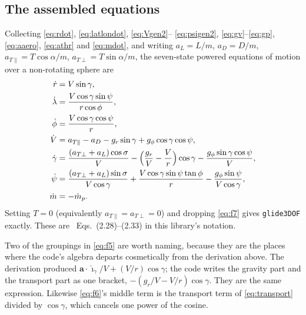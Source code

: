 \documentclass[11pt]{article}
\newcommand{\ig}{\hat{\boldsymbol{\imath}}_{\gamma}}
\newcommand{\code}[1]{\texttt{#1}}
\begin{document}
\subsection{The assembled equations}
\label{sec:assembled}

Collecting \eqref{eq:rdot}, \eqref{eq:latlondot}, \eqref{eq:Vgen2}--%
\eqref{eq:psigen2}, \eqref{eq:gv}--\eqref{eq:gp}, \eqref{eq:aaero},
\eqref{eq:athr} and \eqref{eq:mdot}, and writing $a_L = L/m$, $a_D = D/m$,
$a_{T\parallel} = T\cos\alpha/m$, $a_{T\perp} = T\sin\alpha/m$, the
seven-state powered equations of motion over a non-rotating sphere are
\begin{align}
  \dot r        &= V\sin\gamma ,                                        \label{eq:f1}\\
  \dot \lambda  &= \frac{V\cos\gamma\sin\psi}{r\cos\phi} ,              \label{eq:f2}\\
  \dot \phi     &= \frac{V\cos\gamma\cos\psi}{r} ,                      \label{eq:f3}\\
  \dot V        &= a_{T\parallel} - a_D - g_r\sin\gamma
                   + g_\phi\cos\gamma\cos\psi ,                         \label{eq:f4}\\
  \dot \gamma   &= \frac{(a_{T\perp}+a_L)\cos\sigma}{V}
                   - \Bigl(\frac{g_r}{V} - \frac{V}{r}\Bigr)\cos\gamma
                   - \frac{g_\phi\sin\gamma\cos\psi}{V} ,               \label{eq:f5}\\
  \dot \psi     &= \frac{(a_{T\perp}+a_L)\sin\sigma}{V\cos\gamma}
                   + \frac{V\cos\gamma\sin\psi\tan\phi}{r}
                   - \frac{g_\phi\sin\psi}{V\cos\gamma} ,               \label{eq:f6}\\
  \dot m        &= -\dot m_p .                                          \label{eq:f7}
\end{align}
Setting $T=0$ (equivalently $a_{T\parallel}=a_{T\perp}=0$) and dropping
\eqref{eq:f7} gives \code{glide3DOF} exactly. These are
\cite{Vinh1980}~Eqs.~(2.28)--(2.33) in this library's notation.

Two of the groupings in \eqref{eq:f5} are worth naming, because they are the
places where the code's algebra departs cosmetically from the derivation
above. The derivation produced $\mathbf{a}\cdot\ig/V + (V/r)\cos\gamma$; the
code writes the gravity part and the transport part as one bracket,
$-(g_r/V - V/r)\cos\gamma$. They are the same expression. Likewise
\eqref{eq:f6}'s middle term is the transport term of \eqref{eq:transport}
divided by $\cos\gamma$, which cancels one power of the cosine.
\end{document}
